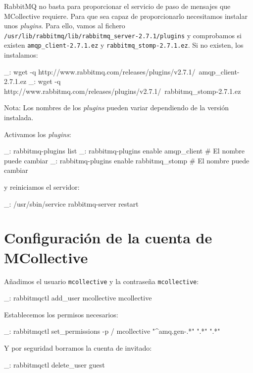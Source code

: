 RabbitMQ no basta para proporcionar el servicio de paso de mensajes que MCollective requiere. Para que sea capaz de proporcionarlo necesitamos instalar unos \emph{plugins}. Para ello, vamos al fichero \texttt{/usr/lib/rabbitmq/lib/rabbitmq\_server-2.7.1/plugins} y comprobamos si existen \texttt{amqp\_client-2.7.1.ez} y \texttt{rabbitmq\_stomp-2.7.1.ez}. Si no existen, los instalamos:

\begin{bashcode}
_: wget -q http://www.rabbitmq.com/releases/plugins/v2.7.1/\
amqp_client-2.7.1.ez
_: wget -q http://www.rabbitmq.com/releases/plugins/v2.7.1/\
rabbitmq_stomp-2.7.1.ez
\end{bashcode}

Nota: Los nombres de los \emph{plugins} pueden variar dependiendo de la versión instalada.

Activamos los \emph{plugins}:

\begin{bashcode}
_: rabbitmq-plugins list
_: rabbitmq-plugins enable amqp_client           # El nombre puede cambiar
_: rabbitmq-plugins enable rabbitmq_stomp        # El nombre puede cambiar
\end{bashcode}

y reiniciamos el servidor:

\begin{bashcode}
_: /usr/sbin/service rabbitmq-server restart
\end{bashcode}


\section{Configuración de la cuenta de MCollective}

Añadimos el usuario \texttt{mcollective} y la contraseña \texttt{mcollective}:
\begin{bashcode}
_: rabbitmqctl add_user mcollective mcollective
\end{bashcode}

Establecemos los permisos necesarios:

\begin{bashcode}
_: rabbitmqctl set_permissions -p / mcollective "^amq.gen-.*" ".*" ".*"
\end{bashcode}

Y por seguridad borramos la cuenta de invitado:

\begin{bashcode}
_: rabbitmqctl delete_user guest
\end{bashcode}


